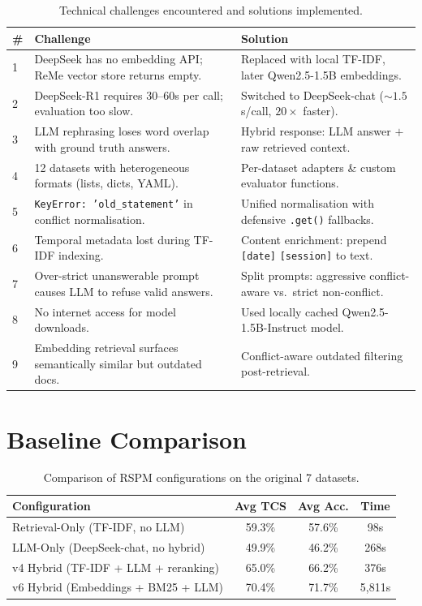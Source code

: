\documentclass[11pt,a4paper]{article}
\begin{document}
\begin{table}[H]
\centering
\caption{Technical challenges encountered and solutions implemented.}
\label{tab:challenges}
\small
\begin{tabularx}{\textwidth}{lXX}
\toprule
\textbf{\#} & \textbf{Challenge} & \textbf{Solution} \\
\midrule
1 & DeepSeek has no embedding API; ReMe vector store returns empty.
  & Replaced with local TF-IDF, later Qwen2.5-1.5B embeddings. \\
2 & DeepSeek-R1 requires 30--60s per call; evaluation too slow.
  & Switched to DeepSeek-chat (${\sim}1.5$s/call, $20\times$ faster). \\
3 & LLM rephrasing loses word overlap with ground truth answers.
  & Hybrid response: LLM answer $+$ raw retrieved context. \\
4 & 12 datasets with heterogeneous formats (lists, dicts, YAML).
  & Per-dataset adapters \& custom evaluator functions. \\
5 & \texttt{KeyError: 'old\_statement'} in conflict normalisation.
  & Unified normalisation with defensive \texttt{.get()} fallbacks. \\
6 & Temporal metadata lost during TF-IDF indexing.
  & Content enrichment: prepend \texttt{[date]} \texttt{[session]} to text. \\
7 & Over-strict unanswerable prompt causes LLM to refuse valid answers.
  & Split prompts: aggressive conflict-aware vs.\ strict non-conflict. \\
8 & No internet access for model downloads.
  & Used locally cached Qwen2.5-1.5B-Instruct model. \\
9 & Embedding retrieval surfaces semantically similar but outdated docs.
  & Conflict-aware outdated filtering post-retrieval. \\
\bottomrule
\end{tabularx}
\end{table}


\section{Baseline Comparison}
\label{sec:baselines}

\begin{table}[H]
\centering
\caption{Comparison of RSPM configurations on the original 7 datasets.}
\label{tab:baselines}
\small
\begin{tabular}{lccc}
\toprule
\textbf{Configuration} & \textbf{Avg TCS} & \textbf{Avg Acc.} & \textbf{Time} \\
\midrule
Retrieval-Only (TF-IDF, no LLM) & 59.3\% & 57.6\% & 98s \\
LLM-Only (DeepSeek-chat, no hybrid) & 49.9\% & 46.2\% & 268s \\
v4 Hybrid (TF-IDF + LLM + reranking) & 65.0\% & 66.2\% & 376s \\
v6 Hybrid (Embeddings + BM25 + LLM) & 70.4\% & 71.7\% & 5{,}811s \\
\bottomrule
\end{tabular}
\end{table}
\end{document}
